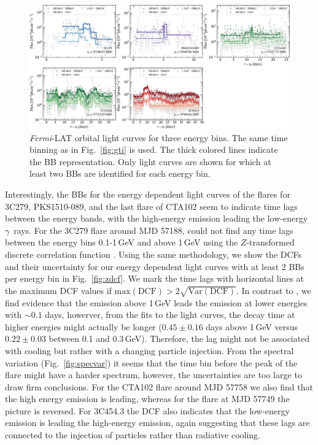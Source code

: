 \documentclass[twocolumn,linenumbers]{aastex62}
\newcommand{\Grays}{$\gamma$~rays\xspace}
\newcommand{\fermiLAT}{\emph{Fermi}-LAT\xspace}
\begin{document}
\begin{figure}
    \centering
    \includegraphics[width = .9 \linewidth]{figures/lc_ebins_ts9.pdf}
    \caption{\fermiLAT orbital light curves for three energy bins. The same time binning as in Fig.~\ref{fig:gti} is used. The thick colored lines indicate the BB representation. Only light curves are shown for which at least two BBs are identified for each energy bin.}
    \label{fig:lcebins}
\end{figure}

Interestingly, the BBs for the energy dependent light curves of the flares for 3C279, PKS1510-089, and the last flare of CTA102 seem to indicate time lags between the energy bands, with the high-energy emission leading the low-energy \Grays.
For the 3C279 flare around MJD 57188, \citet{2015ApJ...808L..48P} could not find any time lags between the energy bins 0.1-1\,GeV and above 1\,GeV using the $Z$-transformed discrete correlation function \citep[DCF;][]{1997ASSL..218..163A,2013arXiv1302.1508A}.
Using the same methodology, we show the DCFs and their uncertainty for our energy dependent light curves with at least 2 BBs per energy bin in Fig.~\ref{fig:zdcf}.
We mark the time lags with horizontal lines at the maximum DCF values if $\mathrm{max}(\mathrm{DCF}) > 2 \sqrt{\mathrm{Var}(\mathrm{DCF})}$.
In contrast to \citet{2015ApJ...808L..48P}, we find evidence that the emission above 1\,GeV leads the emission at lower energies with $\sim 0.1$ days, howerver, from the fits to the light curves, the decay time at higher energies might actually be longer ($0.45\pm0.16$ days above 1\,GeV versus $0.22 \pm 0.03$ between 0.1 and 0.3\,GeV). 
Therefore, the lag might not be associated with cooling but rather with a changing particle injection. From the spectral variation (Fig.~\ref{fig:specvar}) it seems that the time bin before the peak of the flare might have a harder spectrum, however, the uncertainties are too large to draw firm conclusions.
For the CTA102 flare around MJD 57758 we also find that the high energy emission is leading, whereas for the flare at MJD 57749 the picture is reversed. 
For 3C454.3 the DCF also indicates that the low-energy emission is leading the high-energy emission, again suggesting that these lags are connected to the injection of particles rather than radiative cooling.
\end{document}
